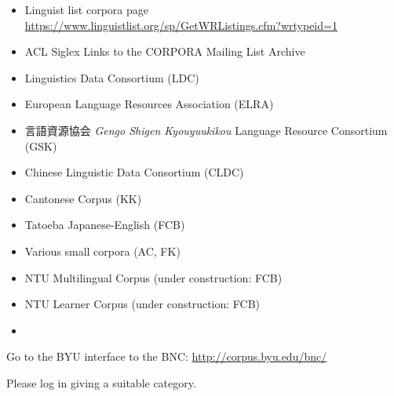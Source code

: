 \documentclass[a4paper,landscape,headrule,footrule]{foils}
\begin{document}

\begin{itemize}
\item Linguist list corpora page
\\ \url{https://www.linguistlist.org/sp/GetWRListings.cfm?wrtypeid=1}
\item ACL Siglex Links to the CORPORA Mailing List Archive
\item Linguistics Data Consortium (LDC)
\item European Language Resources Association (ELRA)
\item 言語資源協会 \textit{Gengo Shigen Kyouyuukikou} Language Resource Consortium (GSK)
\item {} Chinese Linguistic Data Consortium (CLDC)
\end{itemize}


\begin{itemize}
\item Cantonese Corpus (KK)
\item Tatoeba Japanese-English (FCB)
\item Various small corpora (AC, FK)
\item NTU Multilingual Corpus (under construction: FCB)
\item NTU Learner Corpus (under construction: FCB)
\item {}
\end{itemize}


Go to the BYU interface to the BNC: \url{http://corpus.byu.edu/bnc/}

Please log in giving a suitable category.
\end{document}
